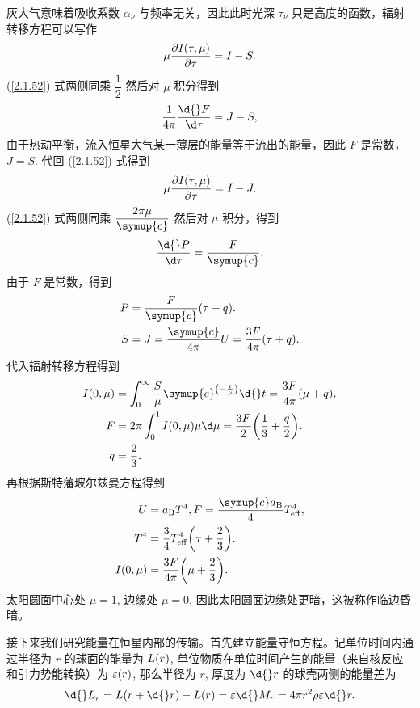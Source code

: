\documentclass[../天体物理基础.tex]{subfiles}
\begin{document}
灰大气意味着吸收系数 $\alpha_{\nu}$ 与频率无关，因此此时光深 $\tau_{\nu}$ 只是高度的函数，辐射转移方程可以写作
\begin{equation}
\mu\frac{\partial{}I\mleft(\tau,\mu\mright)}{\partial\tau}=I-S.\label{2.1.52}
\end{equation}
(\ref{2.1.52}) 式两侧同乘 $\dfrac{1}{2}$ 然后对 $\mu$ 积分得到
\begin{equation}
\frac{1}{4\pi}\frac{\d{}F}{\d\tau}=J-S,
\end{equation}
由于热动平衡，流入恒星大气某一薄层的能量等于流出的能量，因此 $F$ 是常数，$J=S$. 代回 (\ref{2.1.52}) 式得到
\begin{equation}
\mu\frac{\partial{}I\mleft(\tau,\mu\mright)}{\partial\tau}=I-J.
\end{equation}
(\ref{2.1.52}) 式两侧同乘 $\dfrac{2\pi\mu}{\symup{c}}$ 然后对 $\mu$ 积分，得到
\begin{equation}
\frac{\d{}P}{\d\tau}=\frac{F}{\symup{c}},\label{2.1.57}
\end{equation}
由于 $F$ 是常数，得到
\begin{align}
P&=\frac{F}{\symup{c}}\mleft(\tau+q\mright).\\
S&=J=\frac{\symup{c}}{4\pi}U=\frac{3F}{4\pi}\mleft(\tau+q\mright).
\end{align}
代入辐射转移方程得到
\begin{align}
I\mleft(0,\mu\mright)&=\int_{0}^{\infty}\frac{S}{\mu}\symup{e}^{\mleft(-\frac{t}{\mu}\mright)}\d{}t=\frac{3F}{4\pi}\mleft(\mu+q\mright),\\
F&=2\pi\int_{0}^{1}I\mleft(0,\mu\mright)\mu\d\mu=\frac{3F}{2}\mleft(\frac{1}{3}+\frac{q}{2}\mright).\\
q&=\frac{2}{3}.
\end{align}
再根据斯特藩玻尔兹曼方程得到
\begin{align}
U&=a_{\mathrm{B}}T^{4}, F=\frac{\symup{c}a_{\mathrm{B}}}{4}T_{\mathrm{eff}}^{4},\\
T^{4}&=\frac{3}{4}T_{\mathrm{eff}}^{4}\mleft(\tau+\frac{2}{3}\mright).\\
I\mleft(0,\mu\mright)&=\frac{3F}{4\pi}\mleft(\mu+\frac{2}{3}\mright).
\end{align}
太阳圆面中心处 $\mu=1$, 边缘处 $\mu=0$, 因此太阳圆面边缘处更暗，这被称作临边昏暗。

接下来我们研究能量在恒星内部的传输。首先建立能量守恒方程。记单位时间内通过半径为 $r$ 的球面的能量为 $L\mleft(r\mright)$, 单位物质在单位时间产生的能量（来自核反应和引力势能转换）为 $\varepsilon\mleft(r\mright)$, 那么半径为 $r$, 厚度为 $\d{}r$ 的球壳两侧的能量差为
\begin{equation}
\d{}L_{r}=L\mleft(r+\d{}r\mright)-L\mleft(r\mright)=\varepsilon\d{}M_{r}=4\pi{}r^{2}\rho\varepsilon\d{}r.
\end{equation}
\end{document}
